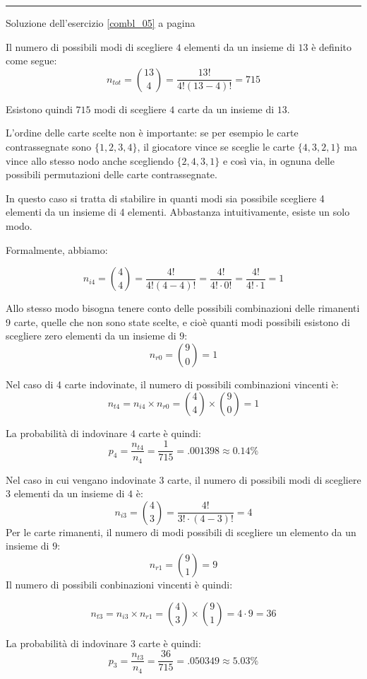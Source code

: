 \vspace{1cm}
\hrule
\vspace{1cm}

Soluzione dell'esercizio \ref{combl_05} a pagina \pageref{combl_05}\label{combs_05}

\vspace{1cm}

Il numero di possibili modi di scegliere $4$ elementi
da un insieme di $13$ è definito come segue:
\[
n_{tot}=\binom{13}{4}=\frac{13!}{4!(13-4)!}=715
\]

Esistono quindi $715$ modi di scegliere $4$ carte da un insieme di $13$.

L'ordine delle carte scelte non è importante: se per esempio le carte 
contrassegnate sono $\{1, 2, 3, 4\}$, il giocatore vince se sceglie 
le carte $\{4, 3, 2, 1\}$ ma vince allo stesso nodo anche 
scegliendo $\{2, 4, 3, 1\}$ e così via, in 
ognuna delle possibili permutazioni delle carte contrassegnate.

In questo caso si tratta di stabilire in quanti modi sia 
possibile scegliere 4 elementi da un insieme di 4 elementi.
Abbastanza intuitivamente, esiste un solo modo.

Formalmente, abbiamo:

\[
n_{i4}=\binom{4}{4}=\frac{4!}{4!(4-4)!}=\frac{4!}{4!\cdot 0!}=\frac{4!}{4!\cdot 1}=1
\]

Allo stesso modo bisogna tenere conto delle possibili combinazioni delle rimanenti 
9 carte, quelle che non sono state scelte, e cioè quanti modi possibili esistono
di scegliere zero elementi da un insieme di $9$:
\[
n_{r0}=\binom{9}{0}=1
\]

Nel caso di 4 carte indovinate, il numero di possibili combinazioni vincenti è:
\[
n_{t4}=n_{i4}\times n_{r0}=\binom{4}{4}\times\binom{9}{0}=1
\]

La probabilità di indovinare $4$ carte è quindi:
\[
p_4=\frac{n_{t4}}{n_4}=\frac{1}{715}=.001398\approx 0.14\%
\]


Nel caso in cui vengano indovinate $3$ carte, il 
numero di possibili modi di scegliere $3$ elementi da un insieme di $4$ è:
\[
n_{i3}=\binom{4}{3}=\frac{4!}{3!\cdot(4-3)!}=4
\]
Per le carte rimanenti, il numero di modi possibili di scegliere un elemento
da un insieme di $9$:
\[
n_{r1}=\binom{9}{1}=9
\]
Il numero di possibili conbinazioni vincenti
è quindi:

\[
n_{t3}=n_{i3}\times n_{r1}=\binom{4}{3}\times\binom{9}{1}=4\cdot 9=36
\]


La probabilità di indovinare $3$ carte è quindi:
\[
p_3=\frac{n_{t3}}{n_4}=\frac{36}{715}=.050349\approx 5.03\%
\]

